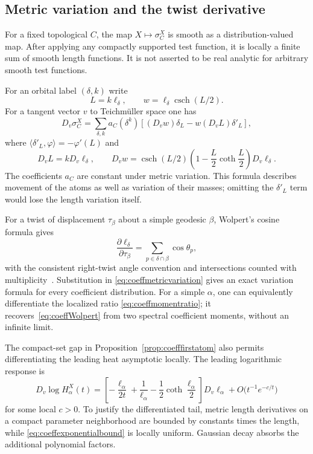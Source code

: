 \documentclass[11pt,a4paper]{article}
\numberwithin{equation}{section}
\theoremstyle{definition}
\theoremstyle{remark}
\begin{document}
\subsection{Metric variation and the twist derivative}

For a fixed topological $C$, the map
$X\mapsto\sigma_C^X$ is smooth as a distribution-valued map.
After applying any compactly supported test function, it is locally
a finite sum of smooth length functions. It is not asserted to be
real analytic for arbitrary smooth test functions.

For an orbital label $(\delta,k)$ write
\[
 L=k\ell_\delta,\qquad
 w=\ell_\delta\operatorname{csch}(L/2).
\]
For a tangent vector $v$ to Teichm\"uller space one has
\begin{equation}
 D_v\sigma_C^X
 =\sum_{\delta,k}a_C(\delta^k)
  \left[(D_vw)\delta_L-w(D_vL)\delta'_L\right],
 \label{eq:coeffmetricvariation}
\end{equation}
where $\langle\delta'_L,\varphi\rangle=-\varphi'(L)$ and
\[
 D_vL=kD_v\ell_\delta,\qquad
 D_vw=\operatorname{csch}(L/2)
       \left(1-\frac L2\coth\frac L2\right)D_v\ell_\delta.
\]
The coefficients $a_C$ are constant under metric variation. This
formula describes movement of the atoms as well as variation of
their masses; omitting the $\delta'_L$ term would lose the length
variation itself.

For a twist of displacement $\tau_\beta$ about a simple geodesic
$\beta$, Wolpert's cosine formula gives
\begin{equation}
 \frac{\partial\ell_\delta}{\partial\tau_\beta}
 =\sum_{p\in\delta\cap\beta}\cos\theta_p,
 \label{eq:coeffWolpert}
\end{equation}
with the consistent right-twist angle convention and intersections
counted with multiplicity~\cite{WolpertTwist}. Substitution in
\eqref{eq:coeffmetricvariation} gives an exact variation formula
for every coefficient distribution. For a simple $\alpha$, one
can equivalently differentiate the localized ratio
\eqref{eq:coeffmomentratio}; it recovers~\eqref{eq:coeffWolpert}
from two spectral coefficient moments, without an infinite limit.

The compact-set gap in Proposition~\ref{prop:coefffirstatom} also
permits differentiating the leading heat asymptotic locally.
The leading logarithmic response is
\begin{equation}
 D_v\log H_\alpha^X(t)
 =\left[-\frac{\ell_\alpha}{2t}
          +\frac1{\ell_\alpha}
          -\frac12\coth\frac{\ell_\alpha}{2}\right]
    D_v\ell_\alpha
  +O\bigl(t^{-1}e^{-c/t}\bigr)
 \label{eq:coeffheatvariation}
\end{equation}
for some local $c>0$. To justify the differentiated tail, metric
length derivatives on a compact parameter neighborhood are bounded
by constants times the length, while
\eqref{eq:coeffexponentialbound} is locally uniform. Gaussian
decay absorbs the additional polynomial factors.
\end{document}
